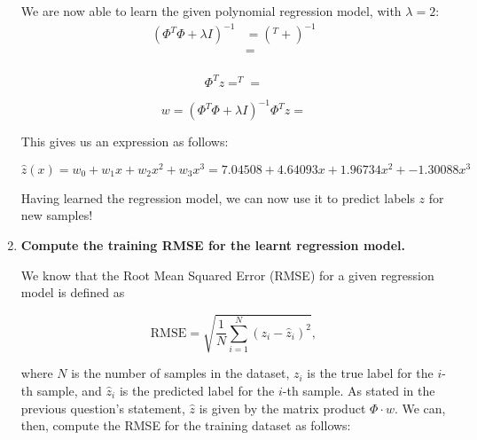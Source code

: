 \documentclass[12pt]{article}
\begin{document}
\begin{enumerate}[leftmargin=\labelsep]
        We are now able to learn the given polynomial regression model, with $\lambda = 2$:
        $$
          \begin{aligned}
            (\Phi^T \Phi + \lambda I)^{-1}
             & = \left(
            ^T
             +
            
            \right)^{-1}                        \\
             & =  \\
          \end{aligned}
        $$

        \begin{equation*}
          \Phi^T z = ^T
           = 
        \end{equation*}

        \begin{equation*}
          w = (\Phi^T \Phi + \lambda I)^{-1} \Phi^T z = 
        \end{equation*}

        This gives us an expression as follows:

        \vspace{-0.5cm}

        $$
          \hat{z}(x) = w_0 + w_1 x + w_2 x^2 + w_3 x^3 = 7.04508 + 4.64093 x + 1.96734 x^2 + -1.30088 x^3
        $$

        Having learned the regression model, we can now use it to predict labels $z$
        for new samples!

        \pagebreak

  \item \textbf{Compute the training RMSE for the learnt regression model.}

        We know that the Root Mean Squared Error (RMSE) for a given regression model is
        defined as

        \begin{equation*}
          \text{RMSE} = \sqrt{\frac{1}{N} \sum_{i=1}^N (z_i - \hat{z}_i)^2},
        \end{equation*}

        where $N$ is the number of samples in the dataset, $z_i$ is the true label for
        the $i$-th sample, and $\hat{z}_i$ is the predicted label for the $i$-th sample.
        As stated in the previous question's statement, $\hat{z}$ is given by the matrix product
        $\Phi \cdot w$. We can, then, compute the RMSE for the training dataset as follows:


\end{enumerate}
\end{document}
